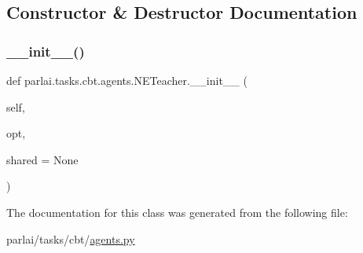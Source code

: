 \subsection{Constructor \& Destructor Documentation}
\mbox{\label{classparlai_1_1tasks_1_1cbt_1_1agents_1_1NETeacher_aee59236dace0e90a86ce8ca23b8e05d2}} 
\subsubsection{\texorpdfstring{\+\_\+\+\_\+init\+\_\+\+\_\+()}{\_\_init\_\_()}}
{\footnotesize\ttfamily def parlai.\+tasks.\+cbt.\+agents.\+N\+E\+Teacher.\+\_\+\+\_\+init\+\_\+\+\_\+ (\begin{DoxyParamCaption}\item[{}]{self,  }\item[{}]{opt,  }\item[{}]{shared = {\ttfamily None} }\end{DoxyParamCaption})}



The documentation for this class was generated from the following file\+:\begin{DoxyCompactItemize}
\item 
parlai/tasks/cbt/\hyperlink{parlai_2tasks_2cbt_2agents_8py}{agents.\+py}\end{DoxyCompactItemize}
